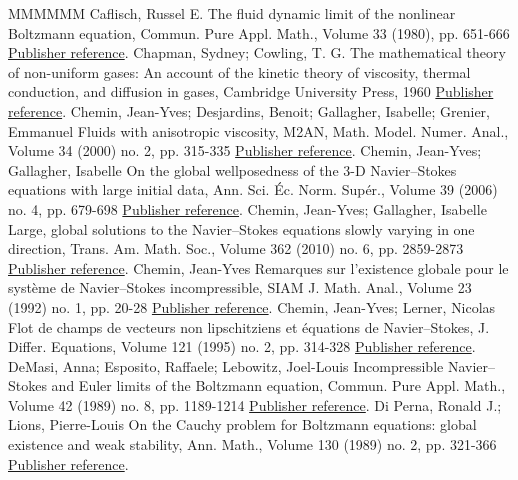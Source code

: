 \documentclass[11pt]{article}
\theoremstyle{definition}
\numberwithin{equation}{section}
\numberwithin{figure}{section}
\numberwithin{table}{section}
\begin{document}
\begin{thebibliography}{MMMMMM}
 Caflisch, Russel E. The fluid dynamic limit of the nonlinear Boltzmann equation, Commun. Pure Appl. Math., Volume 33 (1980), pp. 651-666 \href{https://ahl.centre-mersenne.org/item/AHL_2020__3__561_0/#Caflisch}{Publisher reference}.
 Chapman, Sydney; Cowling, T. G. The mathematical theory of non-uniform gases: An account of the kinetic theory of viscosity, thermal conduction, and diffusion in gases, Cambridge University Press, 1960 \href{https://ahl.centre-mersenne.org/item/AHL_2020__3__561_0/#ChapEns}{Publisher reference}.
 Chemin, Jean-Yves; Desjardins, Benoit; Gallagher, Isabelle; Grenier, Emmanuel Fluids with anisotropic viscosity, M2AN, Math. Model. Numer. Anal., Volume 34 (2000) no. 2, pp. 315-335 \href{https://ahl.centre-mersenne.org/item/AHL_2020__3__561_0/#CDGG}{Publisher reference}.
 Chemin, Jean-Yves; Gallagher, Isabelle On the global wellposedness of the 3-D Navier–Stokes equations with large initial data, Ann. Sci. Éc. Norm. Supér., Volume 39 (2006) no. 4, pp. 679-698 \href{https://ahl.centre-mersenne.org/item/AHL_2020__3__561_0/#cg1}{Publisher reference}.
 Chemin, Jean-Yves; Gallagher, Isabelle Large, global solutions to the Navier–Stokes equations slowly varying in one direction, Trans. Am. Math. Soc., Volume 362 (2010) no. 6, pp. 2859-2873 \href{https://ahl.centre-mersenne.org/item/AHL_2020__3__561_0/#cg}{Publisher reference}.
 Chemin, Jean-Yves Remarques sur l’existence globale pour le système de Navier–Stokes incompressible, SIAM J. Math. Anal., Volume 23 (1992) no. 1, pp. 20-28 \href{https://ahl.centre-mersenne.org/item/AHL_2020__3__561_0/#cheminSIAM}{Publisher reference}.
 Chemin, Jean-Yves; Lerner, Nicolas Flot de champs de vecteurs non lipschitziens et équations de Navier–Stokes, J. Differ. Equations, Volume 121 (1995) no. 2, pp. 314-328 \href{https://ahl.centre-mersenne.org/item/AHL_2020__3__561_0/#cheminlerner}{Publisher reference}.
 DeMasi, Anna; Esposito, Raffaele; Lebowitz, Joel-Louis Incompressible Navier–Stokes and Euler limits of the Boltzmann equation, Commun. Pure Appl. Math., Volume 42 (1989) no. 8, pp. 1189-1214 \href{https://ahl.centre-mersenne.org/item/AHL_2020__3__561_0/#DeMasi-Esposito-Lebowitz}{Publisher reference}.
 Di Perna, Ronald J.; Lions, Pierre-Louis On the Cauchy problem for Boltzmann equations: global existence and weak stability, Ann. Math., Volume 130 (1989) no. 2, pp. 321-366 \href{https://ahl.centre-mersenne.org/item/AHL_2020__3__561_0/#DiPerna-Lions}{Publisher reference}.

\end{thebibliography}
\end{document}
